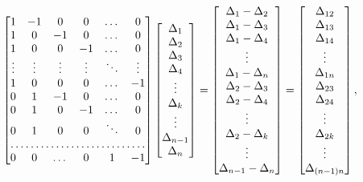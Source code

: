 \documentclass[12pt,a4paper,english]{article}
\begin{document}
\begin{equation*}
\begin{bmatrix}
1 & -1 & 0 & 0 & \dots  & 0 \\
1 & 0 & -1 & 0 & \dots  & 0 \\
1 &  0  & 0 & -1 & \dots   & 0 \\
\vdots & \vdots & \vdots  & \vdots & \ddots & \vdots \\
1 &  0  & 0 & 0 & \dots & -1 \\
0 &  1  & -1 & 0 & \dots & 0 \\
0 & 1 & 0 & -1 & \dots & 0 \\
0 & 1 & 0 & 0 & \ddots & 0 \\
\hdotsfor{6} \\
0 & 0 & \dots & 0& 1 & -1
\end{bmatrix}
 \begin{bmatrix}
\Delta_1 \\ \Delta_2 \\ \Delta_3 \\ \Delta_4 \\ \vdots \\ \Delta_k \\ \vdots \\ \Delta_{n-1} \\ \Delta_n
\end{bmatrix}
 = 
 \begin{bmatrix}
 \Delta_1 - \Delta_2 \\ \Delta_1-\Delta_3 \\ \Delta_1-\Delta_4 \\ \vdots \\ \Delta_1 - \Delta_{n} \\ \Delta_2- \Delta_3 \\ \Delta_2 - \Delta_4 \\ \vdots  \\ \Delta_2-\Delta_k \\ \vdots \\ \Delta_{n-1} - \Delta_n
 \end{bmatrix}
= 
\begin{bmatrix}
\Delta_{12} \\ \Delta_{13} \\ \Delta_{14} \\ \vdots \\ \Delta_{1n} \\ \Delta_{23} \\ \Delta_{24} \\ \vdots \\ \Delta_{2k} \\ \vdots \\ \Delta_{(n-1)n}
\end{bmatrix} , 
\end{equation*}
\end{document}
